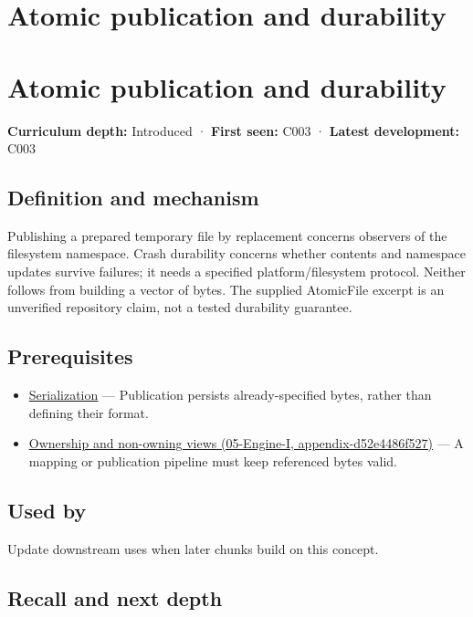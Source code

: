 \hypertarget{appendix-e89a8f290ef5}{}
\section*{Atomic publication and durability}
\section{Atomic publication and durability}\label{atomic-publication-and-durability}

\textbf{Curriculum depth:} Introduced · \textbf{First seen:} C003 · \textbf{Latest development:} C003

\subsection{Definition and mechanism}\label{definition-and-mechanism}

Publishing a prepared temporary file by replacement concerns observers of the filesystem namespace. Crash durability concerns whether contents and namespace updates survive failures; it needs a specified platform/filesystem protocol. Neither follows from building a vector of bytes. The supplied AtomicFile excerpt is an unverified repository claim, not a tested durability guarantee.

\subsection{Prerequisites}\label{prerequisites}

\begin{itemize}
\tightlist
\item
  \hyperref[appendix-91d09ebed979]{Serialization} --- Publication persists already-specified bytes, rather than defining their format.
\item
  \href{}{Ownership and non-owning views (05-Engine-I, appendix-d52e4486f527)} --- A mapping or publication pipeline must keep referenced bytes valid.
\end{itemize}

\subsection{Used by}\label{used-by}

Update downstream uses when later chunks build on this concept.

\subsection{Recall and next depth}\label{recall-and-next-depth}

